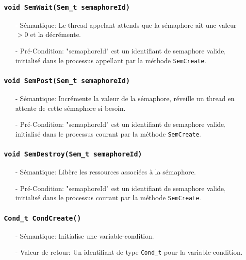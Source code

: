\documentclass[11pt]{article}
\theoremstyle{definition}
\begin{document}
\subsubsection{\texttt{void SemWait(Sem\_t semaphoreId)}}
\begin{itemize}
\item[-]Sémantique: Le thread appelant attends que la sémaphore ait une valeur $>0$ et la décrémente. 
\item[-]Pré-Condition: "semaphoreId" est un identifiant de semaphore valide, initialisé dans le processus
  appellant par la méthode \texttt{SemCreate}.
\end{itemize}

\subsubsection{\texttt{void SemPost(Sem\_t semaphoreId)}}
\begin{itemize}
\item[-]Sémantique: Incrémente la valeur de la sémaphore, réveille un thread en attente de cette sémaphore
  si besoin.
\item[-]Pré-Condition: "semaphoreId" est un identifiant de semaphore valide, initialisé dans le processus
  courant par la méthode \texttt{SemCreate}.
\end{itemize}

\subsubsection{\texttt{void SemDestroy(Sem\_t semaphoreId)}}
\begin{itemize}
\item[-]Sémantique: Libère les ressources associées à la sémaphore.
\item[-]Pré-Condition: "semaphoreId" est un identifiant de semaphore valide, initialisé dans le processus
  courant par la méthode \texttt{SemCreate}.
\end{itemize}

\subsubsection{\texttt{Cond\_t CondCreate()}}
\begin{itemize}
\item[-]Sémantique: Initialise une variable-condition.
\item[-]Valeur de retour: Un identifiant de type \texttt{Cond\_t} pour la variable-condition.
\end{itemize}
\end{document}
